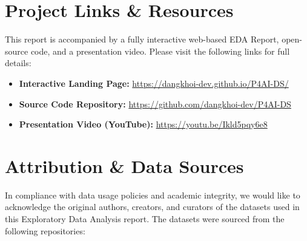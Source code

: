 \documentclass[twoside]{hcmut-report}
\begin{document}
\section*{Project Links \& Resources}

This report is accompanied by a fully interactive web-based EDA Report, open-source code, and a presentation video. Please visit the following links for full details:

\begin{itemize}
    \item \textbf{Interactive Landing Page:} \url{https://dangkhoi-dev.github.io/P4AI-DS/}
    \item \textbf{Source Code Repository:} \url{https://github.com/dangkhoi-dev/P4AI-DS}
    \item \textbf{Presentation Video (YouTube):} \url{https://youtu.be/Ikld5pqy6e8}
\end{itemize}

\section{Attribution \& Data Sources}

In compliance with data usage policies and academic integrity, we would like to acknowledge the original authors, creators, and curators of the datasets used in this Exploratory Data Analysis report. The datasets were sourced from the following repositories:
\end{document}
